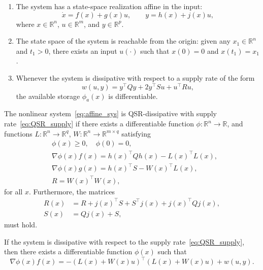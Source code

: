 \begin{enumerate}
    \item The system has a state-space realization affine in the input:
    \begin{equation}\label{eq:affine_sys}
    \dot{x} = f(x) + g(x)u, 
    \qquad y = h(x) + j(x)u,
    \end{equation}
    where $x \in \mathbb{R}^n$, $u \in \mathbb{R}^m$, and $y \in \mathbb{R}^p$.
    
    \item The state space of the system is reachable from the origin:  
    given any $x_1 \in \mathbb{R}^n$ and $t_1 > 0$, there exists an input $u(\cdot)$ such that 
    $x(0) = 0$ and $x(t_1) = x_1$.
    
    \item Whenever the system is dissipative with respect to a supply rate of the form
    \begin{equation}\label{eq:QSR_supply}
    w(u,y) = y^\top Q y + 2 y^\top S u + u^\top R u,
    \end{equation}
    the available storage $\phi_a(x)$ is differentiable.
\end{enumerate}

\begin{theorem}\label{thm:algebraic_dissipativity}
The nonlinear system~\eqref{eq:affine_sys} is QSR-dissipative with supply rate~\eqref{eq:QSR_supply} 
if there exists a differentiable function $\phi : \mathbb{R}^n \to \mathbb{R}$, 
and functions $L : \mathbb{R}^n \to \mathbb{R}^q$, $W : \mathbb{R}^n \to \mathbb{R}^{m \times q}$ 
satisfying
\begin{align}
    & \phi(x) \ge 0, \quad \phi(0) = 0, \label{eq:phi_nonneg}\\
    & \nabla \phi(x) f(x) = h(x)^\top Q h(x) - L(x)^\top L(x), \label{eq:phi_f}\\
    & \nabla \phi(x) g(x) = h(x)^\top S - W(x)^\top L(x), \label{eq:phi_g}\\
    & R = W(x)^\top W(x), \label{eq:R_W}
\end{align}
for all $x$. Furthermore, the matrices
\begin{align}
    R(x) &= R + j(x)^\top S + S^\top j(x) + j(x)^\top Q j(x), \label{eq:R_x}\\
    S(x) &= Q j(x) + S, \label{eq:S_x}
\end{align}
must hold.
\end{theorem}

\begin{lemma}\label{cor:diff_dissipation}
If the system is dissipative with respect to the supply rate~\eqref{eq:QSR_supply}, 
then there exists a differentiable function $\phi(x)$ such that
\begin{equation}\label{eq:diff_dissipation}
\nabla \phi(x) f(x) = - (L(x) + W(x) u)^\top (L(x) + W(x) u) + w(u,y).
\end{equation}
\end{lemma}

